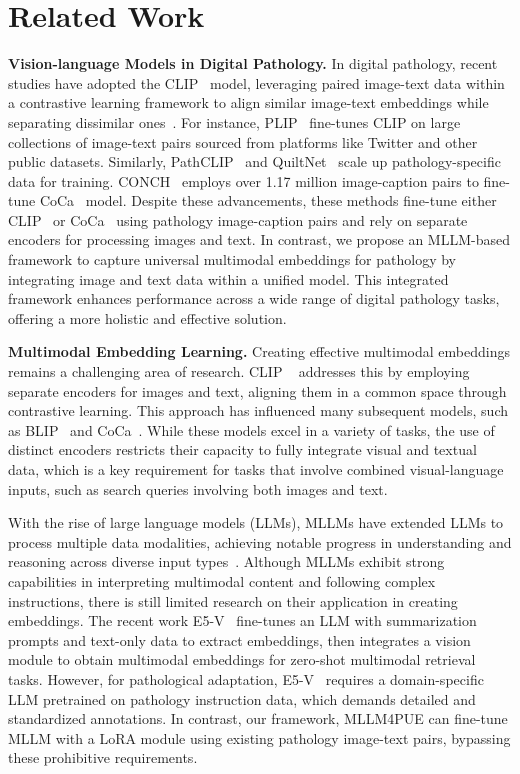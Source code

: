 \section{Related Work}
\textbf{Vision-language Models in Digital Pathology.}
In digital pathology, recent studies have adopted the CLIP~\cite{radford2021learning} model, leveraging paired image-text data within a contrastive learning framework to align similar image-text embeddings while separating dissimilar ones~\cite{lu2023visual,huang2023visual,sun2024pathasst,ikezogwo2024quilt,javed2024cplip}. For instance, PLIP~\cite{huang2023visual} fine-tunes CLIP on large collections of image-text pairs sourced from platforms like Twitter and other public datasets. Similarly, PathCLIP~\cite{sun2024pathasst} and QuiltNet~\cite{ikezogwo2024quilt} scale up pathology-specific data for training. CONCH~\cite{lu2024visual} employs over 1.17 million image-caption pairs to fine-tune CoCa~\cite{yu2022coca} model. Despite these advancements, these methods fine-tune either CLIP~\cite{radford2021learning} or CoCa~\cite{yu2022coca} using pathology image-caption pairs and rely on separate encoders for processing images and text. In contrast, we propose an MLLM-based framework to capture universal multimodal embeddings for pathology by integrating image and text data within a unified model. This integrated framework enhances performance across a wide range of digital pathology tasks, offering a more holistic and effective solution.

\noindent
\textbf{Multimodal Embedding Learning.} Creating effective multimodal embeddings remains a challenging area of research. CLIP ~\cite{radford2021learning} addresses this by employing separate encoders for images and text, aligning them in a common space through contrastive learning. This approach has influenced many subsequent models, such as BLIP~\cite{li2022blip} and CoCa~\cite{yu2022coca}. While these models excel in a variety of tasks, the use of distinct encoders restricts their capacity to fully integrate visual and textual data, which is a key requirement for tasks that involve combined visual-language inputs, such as search queries involving both images and text.

With the rise of large language models (LLMs), MLLMs have extended LLMs to process multiple data modalities, achieving notable progress in understanding and reasoning across diverse input types~\cite{liu2024visual, liu2024improved, li2024llava}. Although MLLMs exhibit strong capabilities in interpreting multimodal content and following complex instructions, there is still limited research on their application in creating embeddings. The recent work E5-V~\cite{jiang2024e5} fine-tunes an LLM with summarization prompts and text-only data to extract embeddings, then integrates a vision module to obtain multimodal embeddings for zero-shot multimodal retrieval tasks. However, for pathological adaptation, E5-V~\cite{jiang2024e5} requires a domain-specific LLM pretrained on pathology instruction data, which demands detailed and standardized annotations. In contrast, our framework, MLLM4PUE can fine-tune MLLM with a LoRA module using existing pathology image-text pairs, bypassing these prohibitive requirements.


